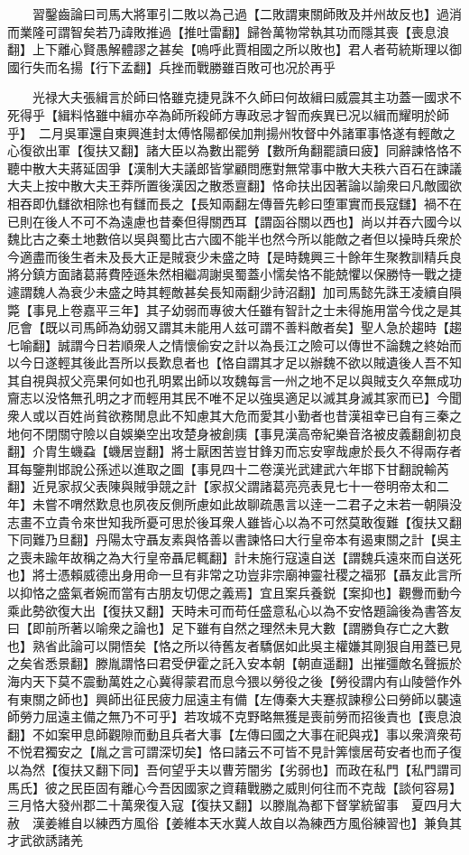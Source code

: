 　　習鑿齒論曰司馬大將軍引二敗以為己過【二敗謂東關師敗及并州故反也】過消而業隆可謂智矣若乃諱敗推過【推吐雷翻】歸咎萬物常執其功而隱其喪【喪息浪翻】上下離心賢愚解體謬之甚矣【嗚呼此賈相國之所以敗也】君人者苟統斯理以御國行失而名揚【行下孟翻】兵挫而戰勝雖百敗可也况於再乎

　　光禄大夫張緝言於師曰恪雖克捷見誅不久師曰何故緝曰威震其主功蓋一國求不死得乎【緝料恪雖中緝亦卒為師所殺師方專政忌才智而疾異已况以緝而耀明於師乎】　二月吳軍還自東興進封太傅恪陽都侯加荆揚州牧督中外諸軍事恪遂有輕敵之心復欲出軍【復扶又翻】諸大臣以為數出罷勞【數所角翻罷讀曰疲】同辭諫恪恪不聽中散大夫蔣延固爭【漢制大夫議郎皆掌顧問應對無常事中散大夫秩六百石在諫議大夫上按中散大夫王莽所置後漢因之散悉亶翻】恪命扶出因著論以諭衆曰凡敵國欲相吞即仇讎欲相除也有讎而長之【長知兩翻左傳晉先軫曰堕軍實而長寇讎】禍不在已則在後人不可不為遠慮也昔秦但得關西耳【謂函谷關以西也】尚以并吞六國今以魏比古之秦土地數倍以吳與蜀比古六國不能半也然今所以能敵之者但以操時兵衆於今適盡而後生者未及長大正是賊衰少未盛之時【是時魏興三十餘年生聚教訓精兵良將分鎮方面諸葛蔣費陸遜朱然相繼凋謝吳蜀蓋小懦矣恪不能兢懼以保勝恃一戰之捷遽謂魏人為衰少未盛之時其輕敵甚矣長知兩翻少詩沼翻】加司馬懿先誅王凌續自隕斃【事見上卷嘉平三年】其子幼弱而專彼大任雖有智計之士未得施用當今伐之是其厄會【既以司馬師為幼弱又謂其未能用人兹可謂不善料敵者矣】聖人急於趨時【趨七喻翻】誠謂今日若順衆人之情懷偷安之計以為長江之險可以傳世不論魏之終始而以今日遂輕其後此吾所以長歎息者也【恪自謂其才足以辦魏不欲以賊遺後人吾不知其自視與叔父亮果何如也孔明累出師以攻魏每言一州之地不足以與賊支久卒無成功齎志以没恪無孔明之才而輕用其民不唯不足以強吳適足以滅其身滅其家而已】今聞衆人或以百姓尚貧欲務閒息此不知慮其大危而愛其小勤者也昔漢祖幸已自有三秦之地何不閉關守險以自娛樂空出攻楚身被創痍【事見漢高帝紀樂音洛被皮義翻創初良翻】介胄生蟣蝨【蟣居豈翻】將士厭困苦豈甘鋒刃而忘安寧哉慮於長久不得兩存者耳每鑒荆邯說公孫述以進取之圖【事見四十二卷漢光武建武六年邯下甘翻說輸芮翻】近見家叔父表陳與賊爭競之計【家叔父謂諸葛亮亮表見七十一卷明帝太和二年】未嘗不喟然歎息也夙夜反側所慮如此故聊疏愚言以逹一二君子之末若一朝隕没志畫不立貴令來世知我所憂可思於後耳衆人雖皆心以為不可然莫敢復難【復扶又翻下同難乃旦翻】丹陽太守聶友素與恪善以書諫恪曰大行皇帝本有遏東關之計【吳主之喪未踰年故稱之為大行皇帝聶尼輒翻】計未施行寇遠自送【謂魏兵遠來而自送死也】將士憑賴威德出身用命一旦有非常之功豈非宗廟神靈社稷之福邪【聶友此言所以抑恪之盛氣者婉而當有古朋友切偲之義焉】宜且案兵養鋭【案抑也】觀釁而動今乘此勢欲復大出【復扶又翻】天時未可而苟任盛意私心以為不安恪題論後為書答友曰【即前所著以喻衆之論也】足下雖有自然之理然未見大數【謂勝負存亡之大數也】熟省此論可以開悟矣【恪之所以待舊友者驕倨如此吳主權嫌其剛狠自用蓋已見之矣省悉景翻】滕胤謂恪曰君受伊霍之託入安本朝【朝直遥翻】出摧彊敵名聲振於海内天下莫不震動萬姓之心冀得蒙君而息今猥以勞役之後【勞役謂内有山陵營作外有東關之師也】興師出征民疲力屈遠主有備【左傳秦大夫蹇叔諫穆公曰勞師以襲遠師勞力屈遠主備之無乃不可乎】若攻城不克野略無獲是喪前勞而招後責也【喪息浪翻】不如案甲息師觀隙而動且兵者大事【左傳曰國之大事在祀與戎】事以衆濟衆苟不悦君獨安之【胤之言可謂深切矣】恪曰諸云不可皆不見計筭懷居苟安者也而子復以為然【復扶又翻下同】吾何望乎夫以曹芳闇劣【劣弱也】而政在私門【私門謂司馬氏】彼之民臣固有離心今吾因國家之資藉戰勝之威則何往而不克哉【談何容易】三月恪大發州郡二十萬衆復入寇【復扶又翻】以滕胤為都下督掌統留事　夏四月大赦　漢姜維自以練西方風俗【姜維本天水冀人故自以為練西方風俗練習也】兼負其才武欲誘諸羌
